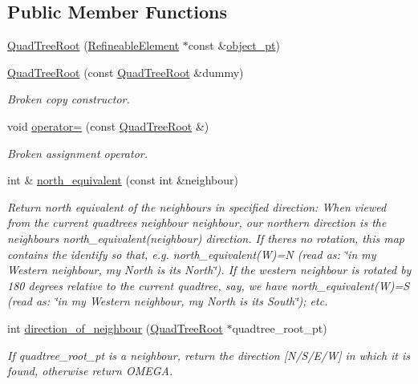 \subsection*{Public Member Functions}
\begin{DoxyCompactItemize}
\item 
\hyperlink{classoomph_1_1QuadTreeRoot_a30cf086b11949193946818c43aeec5e5}{Quad\+Tree\+Root} (\hyperlink{classoomph_1_1RefineableElement}{Refineable\+Element} $\ast$const \&\hyperlink{classoomph_1_1Tree_a2f2eeb0f1dd161f696cccc652974ff4c}{object\+\_\+pt})
\item 
\hyperlink{classoomph_1_1QuadTreeRoot_aa808ed64cac1a2e07229dbc27523555e}{Quad\+Tree\+Root} (const \hyperlink{classoomph_1_1QuadTreeRoot}{Quad\+Tree\+Root} \&dummy)
\begin{DoxyCompactList}\small\item\em Broken copy constructor. \end{DoxyCompactList}\item 
void \hyperlink{classoomph_1_1QuadTreeRoot_afbf242b23375516d29a087417bb1bf30}{operator=} (const \hyperlink{classoomph_1_1QuadTreeRoot}{Quad\+Tree\+Root} \&)
\begin{DoxyCompactList}\small\item\em Broken assignment operator. \end{DoxyCompactList}\item 
int \& \hyperlink{classoomph_1_1QuadTreeRoot_a9b91196bd6112e7f205c0882b163ea2a}{north\+\_\+equivalent} (const int \&neighbour)
\begin{DoxyCompactList}\small\item\em Return north equivalent of the neighbours in specified direction\+: When viewed from the current quadtree\textquotesingle{}s {\ttfamily neighbour} neighbour, our northern direction is the neighbour\textquotesingle{}s north\+\_\+equivalent(neighbour) direction. If there\textquotesingle{}s no rotation, this map contains the identify so that, e.\+g. {\ttfamily north\+\_\+equivalent(\+W)=N} (read as\+: \char`\"{}in my Western
neighbour, my North is its North\char`\"{}). If the western neighbour is rotated by 180 degrees relative to the current quadtree, say, we have {\ttfamily north\+\_\+equivalent(\+W)=S} (read as\+: \char`\"{}in my Western
neighbour, my North is its South\char`\"{}); etc. \end{DoxyCompactList}\item 
int \hyperlink{classoomph_1_1QuadTreeRoot_ac106ae83ae55b7a510d8bad7c5f0db65}{direction\+\_\+of\+\_\+neighbour} (\hyperlink{classoomph_1_1QuadTreeRoot}{Quad\+Tree\+Root} $\ast$quadtree\+\_\+root\+\_\+pt)
\begin{DoxyCompactList}\small\item\em If quadtree\+\_\+root\+\_\+pt is a neighbour, return the direction \mbox{[}N/\+S/\+E/W\mbox{]} in which it is found, otherwise return O\+M\+E\+GA. \end{DoxyCompactList}\end{DoxyCompactItemize}
